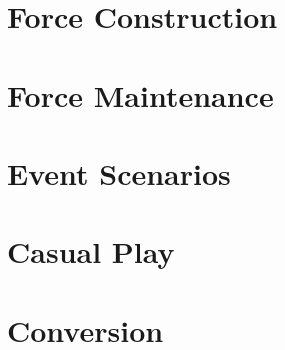 \documentclass{article}
\begin{document}


\newpage

\section{Force Construction}
\label{subsec:event_force_construction}



\newpage

\section{Force Maintenance}
\label{subsec:event_force_maintenance}



\newpage

\section{Event Scenarios}



\newpage

\section{Casual Play}



\section{Conversion}
\end{document}
